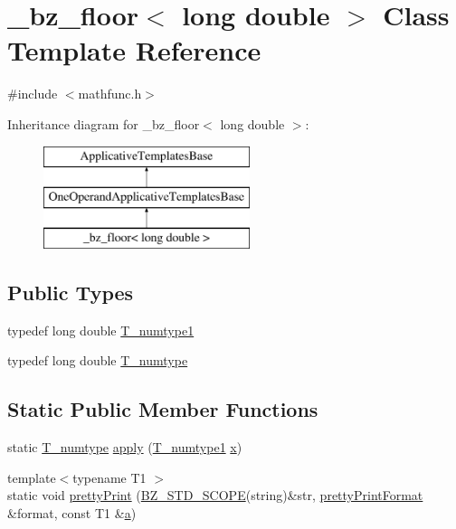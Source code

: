 \hypertarget{class__bz__floor_3_01long_01double_01_4}{}\section{\+\_\+bz\+\_\+floor$<$ long double $>$ Class Template Reference}
\label{class__bz__floor_3_01long_01double_01_4}


{\ttfamily \#include $<$mathfunc.\+h$>$}

Inheritance diagram for \+\_\+bz\+\_\+floor$<$ long double $>$\+:\begin{figure}[H]
\begin{center}
\leavevmode
\includegraphics[height=3.000000cm]{class__bz__floor_3_01long_01double_01_4}
\end{center}
\end{figure}
\subsection*{Public Types}
\begin{DoxyCompactItemize}
\item 
typedef long double \hyperlink{class__bz__floor_3_01long_01double_01_4_ab9a4ef64cab27f5bef8574f99092737e}{T\+\_\+numtype1}
\item 
typedef long double \hyperlink{class__bz__floor_3_01long_01double_01_4_a2efec24a128c46136c86b635f4bf800e}{T\+\_\+numtype}
\end{DoxyCompactItemize}
\subsection*{Static Public Member Functions}
\begin{DoxyCompactItemize}
\item 
static \hyperlink{class__bz__floor_3_01long_01double_01_4_a2efec24a128c46136c86b635f4bf800e}{T\+\_\+numtype} \hyperlink{class__bz__floor_3_01long_01double_01_4_aea62cf5c1612b7ef4dce00a3e29c3489}{apply} (\hyperlink{class__bz__floor_3_01long_01double_01_4_ab9a4ef64cab27f5bef8574f99092737e}{T\+\_\+numtype1} \hyperlink{vecnorm1_8cc_ac73eed9e41ec09d58f112f06c2d6cb63}{x})
\item 
{\footnotesize template$<$typename T1 $>$ }\\static void \hyperlink{class__bz__floor_3_01long_01double_01_4_ad3fd6a7a2b82216b4ed4827a27dfa30e}{pretty\+Print} (\hyperlink{numinquire_8h_a2b24ffc3b4ef9803956bc7715c6c7b83}{B\+Z\+\_\+\+S\+T\+D\+\_\+\+S\+C\+O\+P\+E}(string)\&str, \hyperlink{classprettyPrintFormat}{pretty\+Print\+Format} \&format, const T1 \&\hyperlink{gen__mat5files_8m_aae328bf20413f220e38aec4d95bfd6da}{a})
\end{DoxyCompactItemize}


